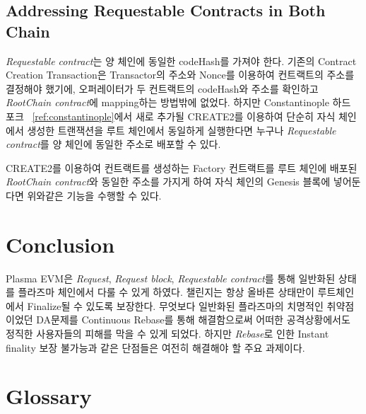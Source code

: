 \documentclass[letterpaper, 11pt]{article}
\begin{document}
\subsection{Addressing Requestable Contracts in Both Chain}
\begin{CJK}{UTF8}{mj}
\emph{Requestable contract}는 양 체인에 동일한 codeHash를 가져야 한다. 기존의 Contract Creation Transaction은 Transactor의 주소와 Nonce를 이용하여 컨트랙트의 주소를 결정해야 했기에, 오퍼레이터가 두 컨트랙트의 codeHash와 주소를 확인하고 \emph{RootChain contract}에 mapping하는 방법밖에 없었다. 하지만 Constantinople 하드 포크 ~\ref{ref:constantinople}에서 새로 추가될 CREATE2를 이용하여 단순히 자식 체인에서 생성한 트랜잭션을 루트 체인에서 동일하게 실행한다면 누구나 \emph{Requestable contract}를 양 체인에 동일한 주소로 배포할 수 있다.

CREATE2를 이용하여 컨트랙트를 생성하는 Factory 컨트랙트를 루트 체인에 배포된 \emph{RootChain contract}와 동일한 주소를 가지게 하여 자식 체인의 Genesis 블록에 넣어둔다면 위와같은 기능을 수행할 수 있다.
\end{CJK}


\section{Conclusion}
\begin{CJK}{UTF8}{mj}
Plasma EVM은 \emph{Request}, \emph{Request block}, \emph{Requestable contract}를 통해 일반화된 상태를 플라즈마 체인에서 다룰 수 있게 하였다. 챌린지는 항상 올바른 상태만이 루트체인에서 Finalize될 수 있도록 보장한다. 무엇보다 일반화된 플라즈마의 치명적인 취약점이었던 DA문제를 Continuous Rebase를 통해 해결함으로써 어떠한 공격상황에서도 정직한 사용자들의 피해를 막을 수 있게 되었다. 하지만 \emph{Rebase}로 인한 Instant finality 보장 불가능과 같은 단점들은 여전히 해결해야 할 주요 과제이다.
\end{CJK}

\newpage


\appendix
\section{Glossary} \label{appendix:glossary}
\end{document}
